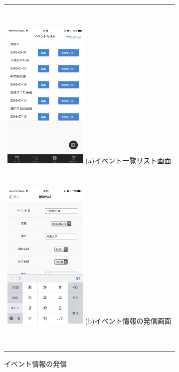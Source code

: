 \begin{figure}[htbp]
  \begin{center}
    \begin{tabular}{c}
​
      \begin{minipage}{0.33\hsize}
        \begin{center}
\includegraphics[width=4cm]{event_list.PNG}
          \hspace{1cm} %
          {\footnotesize (a)イベント一覧リスト画面}
        \end{center}
      \end{minipage}
​
      \begin{minipage}{0.33\hsize}
        \begin{center}
\includegraphics[width=4cm]{event_add.png}
          \hspace{1cm}%
          {\footnotesize (b)イベント情報の発信画面}
        \end{center}
      \end{minipage}
​
    \end{tabular}
    \caption{イベント情報の発信}
    \label{fig:lena}
  \end{center}
\end{figure}
​
